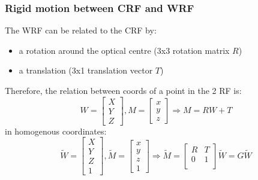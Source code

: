 \documentclass{article}
\begin{document}
\subsubsection{Rigid motion between CRF and WRF}
The WRF can be related to the CRF by:
\begin{itemize}
    \item a rotation around the optical centre (3x3 rotation matrix $R$)
    \item a translation (3x1 translation vector $T$)
\end{itemize}
Therefore, the relation between coords of a point in the 2 RF is:
\begin{equation}
    W=\begin{bmatrix}
        X\\
        Y\\
        Z
    \end{bmatrix},M=\begin{bmatrix}
        x\\
        y\\
        z
    \end{bmatrix} \Rightarrow M=RW+T
\end{equation}
in homogenous coordinates:
\begin{equation}
    \tilde{W}=\begin{bmatrix}
        X\\
        Y\\
        Z\\
        1
    \end{bmatrix}, \tilde{M}= \begin{bmatrix}
        x\\
        y\\
        z\\
        1
    \end{bmatrix} \Rightarrow \tilde{M} = \begin{bmatrix}
        R & T\\
        0 & 1\\
    \end{bmatrix} \tilde{W}=G\tilde{W}
\end{equation}
\end{document}
